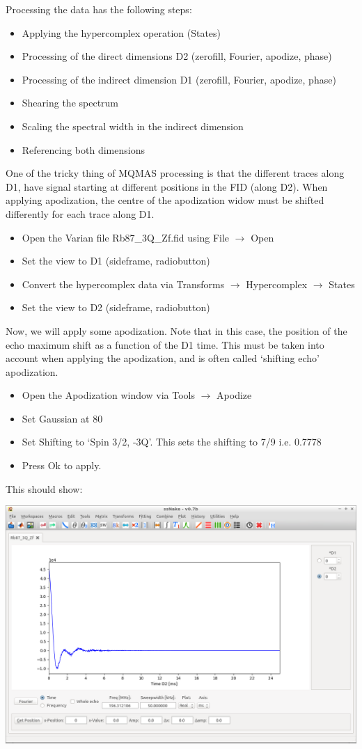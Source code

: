\documentclass[11pt,a4paper]{article}
\begin{document}
Processing the data has the following steps:
\begin{itemize}
  \item Applying the hypercomplex operation (States)
  \item Processing of the direct dimensions D2 (zerofill, Fourier, apodize, phase)
  \item Processing of the indirect dimension D1 (zerofill, Fourier, apodize, phase)
  \item Shearing the spectrum
  \item Scaling the spectral width in the indirect dimension
  \item Referencing both dimensions
\end{itemize}

One of the tricky thing of MQMAS processing is that the different traces along D1, have signal
starting at different positions in the FID (along D2). When applying apodization, the centre of the
apodization widow must be shifted differently for each trace along D1.


\begin{itemize}
	\item Open the Varian file Rb87\_3Q\_Zf.fid using File $\longrightarrow$ Open
	\item Set the view to D1 (sideframe, radiobutton)
	\item Convert the hypercomplex data via Transforms  $\longrightarrow$ Hypercomplex  $\longrightarrow$
	  States
	\item Set the view to D2 (sideframe, radiobutton)
\end{itemize}
Now, we will apply some apodization. Note that in this case, the position of the echo maximum shift
as a function of the D1 time. This must be taken into account when applying the apodization, and is
often called `shifting echo' apodization.

\begin{itemize}
	\item Open the Apodization window via Tools $\longrightarrow$ Apodize
 \item Set Gaussian at 80
 \item Set Shifting to `Spin 3/2, -3Q'. This sets the shifting to 7/9 i.e. 0.7778
 \item Press Ok to apply.
\end{itemize}
This should show:
\begin{center}
\includegraphics[width=0.8\linewidth]{Figs/Fig1.png}
\end{center}
\end{document}

